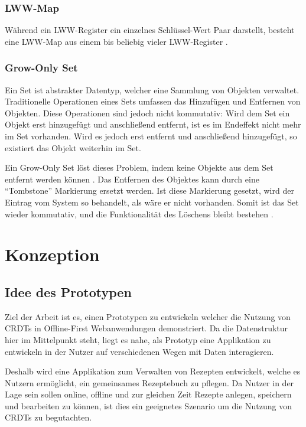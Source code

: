 \documentclass[a4paper, 12pt]{scrreprt}
\begin{document}
\subsection{LWW-Map}
\sloppypar
Während ein \ac{LWW-Register} ein einzelnes Schlüssel-Wert Paar darstellt, besteht eine LWW-Map aus einem bis beliebig vieler LWW-Register \autocite[43]{PhdthesisLwwMap}.


\subsection{Grow-Only Set}
\label{sec:g-set}
Ein Set ist abstrakter Datentyp, welcher eine Sammlung von Objekten verwaltet. Traditionelle Operationen eines Sets umfassen das Hinzufügen und Entfernen von Objekten. Diese Operationen sind jedoch nicht kommutativ: Wird dem Set ein Objekt erst hinzugefügt und anschließend entfernt, ist es im Endeffekt nicht mehr im Set vorhanden. Wird es jedoch erst entfernt und anschließend hinzugefügt, so existiert das Objekt weiterhin im Set.

Ein Grow-Only Set löst dieses Problem, indem keine Objekte aus dem Set entfernt werden können  \autocite[S.17]{ArticlePureOP}. Das Entfernen des Objektes kann durch eine \enquote{Tombstone} Markierung ersetzt werden. Ist diese Markierung gesetzt, wird der Eintrag vom System so behandelt, als wäre er nicht vorhanden. Somit ist das Set wieder kommutativ, und die Funktionalität des Löschens bleibt bestehen \autocite[S.7]{InproceedingsTombstone}.



\chapter{Konzeption}

\section{Idee des Prototypen}
Ziel der Arbeit ist es, einen Prototypen zu entwickeln welcher die Nutzung von CRDTs in Offline-First Webanwendungen demonstriert. Da die Datenstruktur hier im Mittelpunkt steht, liegt es nahe, als Prototyp eine Applikation zu entwickeln in der Nutzer auf verschiedenen Wegen mit Daten interagieren.

Deshalb wird eine Applikation zum Verwalten von Rezepten entwickelt, welche es Nutzern ermöglicht, ein gemeinsames Rezeptebuch zu pflegen. Da Nutzer in der Lage sein sollen online, offline und zur gleichen Zeit Rezepte anlegen, speichern und bearbeiten zu können, ist dies ein geeignetes Szenario um die Nutzung von CRDTs zu begutachten. 
\end{document}
